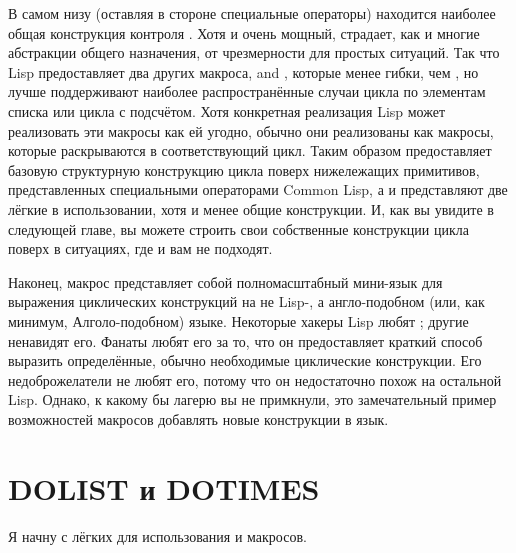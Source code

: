 В самом низу (оставляя в стороне специальные операторы) находится наиболее общая
конструкция контроля . Хотя и очень мощный,  страдает, как и многие
абстракции общего назначения, от чрезмерности для простых ситуаций. Так что Lisp
предоставляет два других макроса,  and , которые менее гибки,
чем , но лучше поддерживают наиболее распространённые случаи цикла по элементам
списка или цикла с подсчётом. Хотя конкретная реализация Lisp может реализовать эти
макросы как ей угодно, обычно они реализованы как макросы, которые раскрываются в
соответствующий  цикл. Таким образом  предоставляет базовую структурную
конструкцию цикла поверх нижележащих примитивов, представленных специальными операторами
Common Lisp, а  и  представляют две лёгкие в использовании,
хотя и менее общие конструкции. И, как вы увидите в следующей главе, вы можете строить
свои собственные конструкции цикла поверх  в ситуациях, где  и
 вам не подходят.

Наконец, макрос  представляет собой полномасштабный мини-язык для выражения
циклических конструкций на не Lisp-, а англо-подобном (или, как минимум, Алголо-подобном)
языке. Некоторые хакеры Lisp любят ; другие ненавидят его. Фанаты 
любят его за то, что он предоставляет краткий способ выразить определённые, обычно
необходимые циклические конструкции. Его недоброжелатели не любят его, потому что он
недостаточно похож на остальной Lisp. Однако, к какому бы лагерю вы не примкнули, это
замечательный пример возможностей макросов добавлять новые конструкции в язык.

\section{DOLIST и DOTIMES}

Я начну с лёгких для использования  и  макросов.

